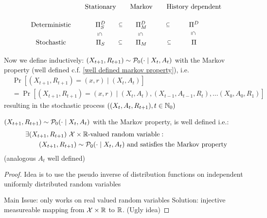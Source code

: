 \begin{definition}
\[\begin{tikzcd}[row sep = small, column sep = small]
		&\text{Stationary} & \text{Markov} & \text{History dependent}
		\\
		\text{Deterministic} 
		& \detPolicy
			\arrow[draw=none, shift right=2]{r}{\subseteq} 
			\ar[draw=none, shift right=2.7]{d}{\vsubseteq}
		& \Pi_M^D
			\arrow[draw=none, shift right=2]{r}{\subseteq} 
			\ar[draw=none, shift right=2.7]{d}{\vsubseteq}
		& \Pi^D
			\ar[draw=none, shift right=2.7]{d}{\vsubseteq}
		\\ 
		\text{Stochastic} 
		& \statPolicy 
			\arrow[draw=none, shift right=2]{r}{\subseteq} 
		& \Pi_M
			\arrow[draw=none, shift right=2]{r}{\subseteq}
		& \Pi
	\end{tikzcd}
	\]
\end{definition}

Now we define inductively: \((X_{t+1}, R_{t+1})\sim\mathcal{P}_0(\cdot\mid X_t, A_t)\) with the Markov property (well defined c.f. \ref{well defined markov property}), i.e.
\begin{align}
\label{X,R Markov}
	&\Pr[(X_{t+1}, R_{t+1})=(x,r)\mid (X_t,A_t)]\\
	&=\Pr[(X_{t+1},R_{t+1})=(x,r) \mid (X_t,A_t),(X_{t-1},A_{t-1},R_t), 
	\dots (X_0,A_0,R_1)] \nonumber
\end{align}
resulting in the stochastic process \(((X_t,A_t,R_{t+1}), t\in \mathbb{N}_0)\)
\begin{remark}\label{well defined markov property}
	\((X_{t+1}, R_{t+1})\sim\mathcal{P}_0(\cdot\mid X_t, A_t)\) with the Markov property, is well defined i.e.:
	\begin{align*}
		&\exists (X_{t+1}, R_{t+1})\ \mathcal{X}\times\mathbb{R}\text{-valued random variable}: \\ 
		&\qquad (X_{t+1}, R_{t+1})\sim\mathcal{P}_0(\cdot\mid X_t, A_t) \text{ and satisfies the Markov property}
	\end{align*}
	(analogous \(A_t\) well defined)
\end{remark}
\begin{proof}
	Idea is to use the pseudo inverse of distribution functions on independent uniformly distributed random variables

	Main Issue: only works on real valued random variables
	Solution: injective measureable mapping from \(\mathcal{X}\times\mathbb{R}\) to \(\mathbb{R}\). (Ugly idea)
\end{proof}

